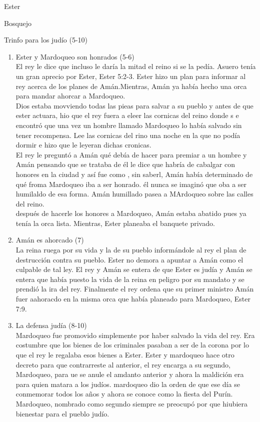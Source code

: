 \documentclass[12pt]{article}
\begin{document}
\begin{section}{Ester}
\begin{subsection}{Bosquejo}
\begin{subsubsection}{Trinfo para los judío (5-10)}
			\begin{enumerate}
				\item Ester y Mardoqueo son honrados (5-6)\\
					El rey le dice que incluso le daría la mitad el reino si se la pedía. Asuero tenía un gran aprecio por Ester, Ester 5:2-3. Ester hizo un plan para informar al rey acerca de los planes de Amán.Mientras, Amán ya había hecho una orca para mandar ahorcar a Mardoqueo. \\
					Dios estaba movviendo todas las pieas para salvar a su pueblo y antes de que ester actuara, hio que el rey fuera a eleer las cornicas del reino donde s e encontró que una vez un hombre llamado Mardoqueo lo había salvado sin tener recompensa. Lee las cornicas del rino una noche en la que no podía dormir e hizo que le leyeran dichas cronicas.\\
					El rey le preguntó a Amán qué debía de hacer para premiar a un hombre y Amán pensando que se trataba de él le dice que habría de cabalgar con honores en la ciudad y así fue como , sin saberl, Amán había determinado de qué froma Mardoqueo iba a ser honrado. él nunca se imaginó que oba a ser humilaldo de esa forma. Amán humillado pasea a MArdoqueo sobre las calles del reino.\\
					después de hacerle los honores a Mardoqueo, Amán estaba abatido pues ya tenía la orca lista. Mientras, Ester planeaba el banquete privado.
				\item Amán es ahorcado (7)\\
					La reina ruega por su vida y la de su pueblo informándole al rey el plan de destrucción contra su pueblo. Ester no demora a apuntar a Amán como el culpable de tal ley. El rey y Amán se entera de que Ester es judía y Amán se entera que había puesto la vida de la reina en peligro por su mandato y se prendió la ira del rey. Finalmente el rey ordena que su primer ministro Amán fuer aahoracdo en la misma orca que había planeado para Mardoqueo, Ester 7:9.
				\item La defensa judía (8-10)\\
					Mardoqueo fue promovido simplemente por haber salvado la vida del rey. Era costumbre que los bienes de los criminales pasaban a ser de la corona por lo que el rey le regalaba esos bienes a Ester. Ester y mardoqueo hace otro decreto para que contrarreste al anterior, el rey encarga a su segundo, Mardoqueo, para ue se anule el amdanto anterior y ahora la maldición era para quien matara a los judíos. mardoqueo dio la orden de que ese día se conmemorar todos los años y ahora se conoce como la fiesta del Purín. Mardoqueo, nombrado como segundo siempre se preocupó por que hiubiera bienestar para el pueblo judío.
			\end{enumerate}

		\end{subsubsection}
	\end{subsection}
\end{section}
\end{document}
